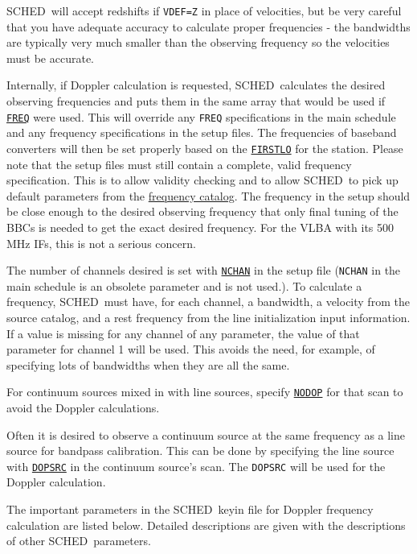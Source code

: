 \documentclass{report}
\newcommand{\schedb}{{\sc SCHED~}}
\begin{document}
\schedb will accept redshifts if {\tt VDEF=Z} in place of
velocities, but be very careful that you have adequate accuracy
to calculate proper frequencies - the bandwidths are typically
very much smaller than the observing frequency so the velocities
must be accurate.

Internally, if Doppler calculation is requested, \schedb calculates
the desired observing frequencies and puts them in the same array that
would be used if 
{\hyperref[MP:FREQ]{{\tt FREQ}}} were used. This will
override any {\tt FREQ} specifications in the main schedule and any
frequency specifications in the setup files.  The frequencies of
baseband converters will then be set properly based on the
{\hyperref[SP:FIRSTLO]{{\tt FIRSTLO}}} for the station.  Please note that
the setup files must still contain a complete, valid frequency
specification.  This is to allow validity checking and to allow
\schedb to pick up default parameters from the
{\hyperref[SEC:FRQCAT]{frequency catalog}}.  The frequency in the setup
should be close enough to the desired observing frequency that only
final tuning of the BBCs is needed to get the exact desired frequency.
For the VLBA with its 500 MHz IFs, this is not a serious concern. 

The number of channels desired is set with 
{\hyperref[SP:NCHAN]{{\tt NCHAN}}}
in the setup file ({\tt NCHAN} in the main schedule
is an obsolete parameter and is not used.).  To calculate a frequency,
\schedb must have, for each channel, a bandwidth, a velocity from
the source catalog, and a rest frequency from the line initialization
input information.  If a value is missing for any channel of any
parameter, the value of that parameter for channel 1 will be
used. This avoids the need, for example, of specifying lots of
bandwidths when they are all the same.

For continuum sources mixed in with line sources, specify 
{\hyperref[MP:DOPPLER]{{\tt NODOP}}}
for that scan to avoid the Doppler calculations.

Often it is desired to observe a continuum source at the same
frequency as a line source for bandpass calibration. This can be done
by specifying the line source with 
{\hyperref[MP:DOPSRC]{{\tt DOPSRC}}}
in the continuum source's scan. The {\tt DOPSRC} will be used for the
Doppler calculation.

The important parameters in the \schedb keyin file for Doppler
frequency calculation are listed below. Detailed descriptions are
given with the descriptions of other \schedb parameters.
\end{document}
